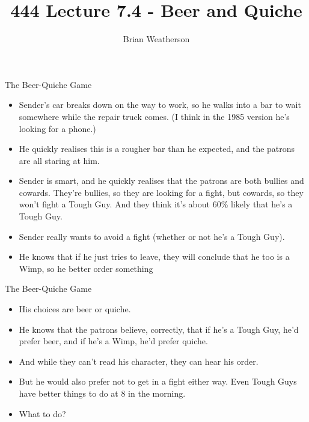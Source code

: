 \documentclass[
  ignorenonframetext,
]{beamer}
\title{444 Lecture 7.4 - Beer and Quiche}
\author{Brian Weatherson}
\date{}
\providecommand{\tightlist}{%
  \setlength{\itemsep}{0pt}\setlength{\parskip}{0pt}}
\begin{document}
\frame{\titlepage}

\begin{frame}{The Beer-Quiche Game}
\protect\hypertarget{the-beer-quiche-game}{}
\begin{itemize}
\tightlist
\item
  Sender's car breaks down on the way to work, so he walks into a bar to
  wait somewhere while the repair truck comes. (I think in the 1985
  version he's looking for a phone.)
\item
  He quickly realises this is a rougher bar than he expected, and the
  patrons are all staring at him.
\item
  Sender is smart, and he quickly realises that the patrons are both
  bullies and cowards. They're bullies, so they are looking for a fight,
  but cowards, so they won't fight a Tough Guy. And they think it's
  about 60\% likely that he's a Tough Guy.
\item
  Sender really wants to avoid a fight (whether or not he's a Tough
  Guy).
\item
  He knows that if he just tries to leave, they will conclude that he
  too is a Wimp, so he better order something
\end{itemize}
\end{frame}

\begin{frame}{The Beer-Quiche Game}
\protect\hypertarget{the-beer-quiche-game-1}{}
\begin{itemize}
\tightlist
\item
  His choices are beer or quiche.
\item
  He knows that the patrons believe, correctly, that if he's a Tough
  Guy, he'd prefer beer, and if he's a Wimp, he'd prefer quiche.
\item
  And while they can't read his character, they can hear his order.
\item
  But he would also prefer not to get in a fight either way. Even Tough
  Guys have better things to do at 8 in the morning.
\item
  What to do?
\end{itemize}
\end{frame}
\end{document}

